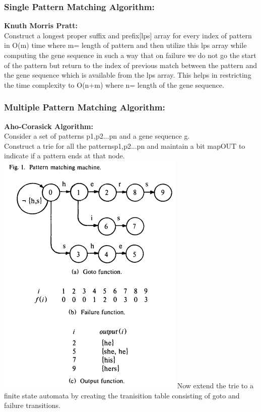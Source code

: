 \documentclass[a4paper,11pt,twocolumn]{article}
\begin{document}
\subsubsection{Single Pattern Matching Algorithm:}
\textbf{Knuth Morris Pratt:} \\Construct a longest proper suffix and prefix[lps] array for every index of pattern in O(m) time where m= length of pattern and then utilize this lps array while computing the gene sequence in such a way that on failure we do not go the start of the pattern but return to the index of previous match between the pattern and the gene sequence which is available from the lps array. This helps in restricting the time complexity to O(n+m) where n= length of the gene sequence.\\
\subsubsection{Multiple Pattern Matching Algorithm:}  
\textbf{Aho-Corasick Algorithm:} \\Consider a set of patterns {p1,p2...pn} and a gene sequence g. \\
Construct a trie for all the patterns{p1,p2...pn} and maintain a bit map{OUT} to indicate if a pattern ends at that node.\\
\includegraphics[scale=0.54]{trie}
Now extend the trie to a finite state automata by creating the tranisition table consisting of goto and failure transitions.\\
\end{document}
